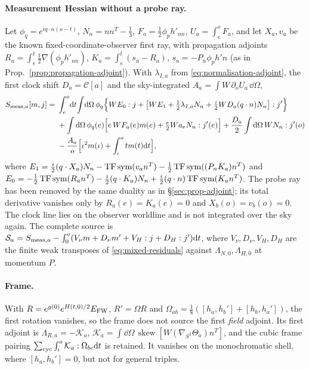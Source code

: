 \paragraph{Measurement Hessian without a probe ray.} Let $\phi_q=e^{iq\cdot n(o-t)}$,
$N_n=nn^T-\frac13$, $F_a=\frac12\phi_ph'_{nn}$, $U_a=\int_e^oF_a$, and let $X_a,v_a$ be the known
fixed-coordinate-observer first ray, with propagation adjoints
$R_a=\int_e^t\frac12\nabla(\phi_ph'_{nn})$, $K_a=\int_e^t(s_a-R_a)$, $s_a=-P_n\phi_ph'n$
(as in Prop.~\ref{prop:propagation-adjoint}). With $\lambda_{I,a}$ from
\eqref{eq:normalisation-adjoint}, the first clock shift $D_a=\mathcal C[a]$ and the sky-integrated
$A_a=\int W\,\partial_oU_a\,\dd\Omega$,
\begin{equation}\label{eq:measurement-source}
\begin{split}
 S_{{\rm meas},a}[m,j]={}&\int_e^o\!\mathrm{d} t\!\int\!\mathrm{d}\Omega\,\phi_q\Big\{WE_0:j
 +\big[WE_1+\tfrac12\lambda_{I,a}N_n+\tfrac i2WD_a(q\cdot n)N_n\big]:j'\Big\}\\
 &+\int\mathrm{d}\Omega\,\phi_q(e)\Big[e\,WF_a(e)m(e)+\tfrac e2Wa_eN_n:j'(e)\Big]
 +\frac{D_a}2\int\mathrm{d}\Omega\,WN_n:j'(o)\\
 &-\frac{A_a}{o}\Big[\iota^2m(\iota)+\int_\iota^otm(t)\mathrm{d} t\Big],
\end{split}
\end{equation}
where $E_1=\frac i2(q\cdot X_a)N_n-\operatorname{TF}\operatorname{sym}(v_an^T)-\frac12\operatorname{TF}\operatorname{sym}((P_nK_a)n^T)$
and $E_0=-\frac12\operatorname{TF}\operatorname{sym}(R_an^T)-\frac i2(q\cdot K_a)N_n
+\frac i2(q\cdot n)\operatorname{TF}\operatorname{sym}(K_an^T)$. The probe ray has been removed by the same
duality as in \S\ref{sec:prop-adjoint}; its total derivative vanishes only by
$R_a(e)=K_a(e)=0$ and $X_b(o)=v_b(o)=0$. The clock line lies on the observer worldline and is not
integrated over the sky again. The complete source is
$\mathcal S_a=S_{{\rm meas},a}-\int_0^o(V_\nu m+D_\nu m'+V_H:j+D_H:j')\mathrm{d} t$, where
$V_\nu,D_\nu,V_H,D_H$ are the finite weak transposes of \eqref{eq:mixed-residuals} against
$\Lambda_{N,0},\Lambda_{H,0}$ at momentum $P$.

\paragraph{Frame.} With $R=e^{g(0)}e^{H(t,0)/2}E_{\rm FW}$, $R'=\Omega R$ and
$\Omega_{ab}=\frac18([h_a,h_b']+[h_b,h_a'])$, the first rotation vanishes, so the frame does not
source the first \emph{field} adjoint. Its first adjoint is
$\Lambda_{R,a}=-\mathcal K_a$, $\mathcal K_a=\int\dd\Omega\,\operatorname{skew}[W(\nabla_{S^2}\Theta_a)n^T]$,
and the cubic frame pairing $\sum_{\rm cyc}\int_\iota^o\mathcal K_a:\Omega_{bc}\mathrm{d} t$ is retained.
It vanishes on the monochromatic shell, where $[h_a,h_b']=0$, but not for general triples.

